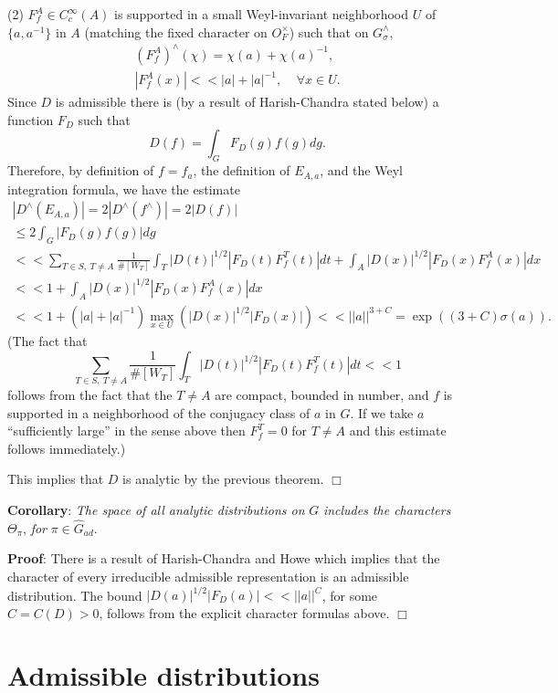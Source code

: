 \documentclass[11pt, a4paper]{article}
\begin{document}
(2) $F_f^A\in C_c^\infty (A)$ is supported in a small Weyl-invariant neighborhood $U$ of $\{a,a^{-1}\}$ in $%
A$ (matching the fixed character on $O_F^{\times }$) such that on $G_\sigma ^{\wedge }$,
\[
\begin{array}{c}
(F_f^A)^{\wedge }(\chi )=\chi (a)+\chi (a)^{-1}, \\ 
|F_f^A(x)|<<|a|+|a|^{-1},\;\;\;\;\forall x\in U.
\end{array}
\]
Since $D$ is admissible there is (by a result of Harish-Chandra stated
below) a function $F_D$ such that
\[
D(f)=\int_GF_D(g)f(g)dg.
\]
Therefore, by definition of $f=f_a$, the definition of $E_{A,a}$, and the
Weyl integration formula, we have the estimate
\[
\begin{array}{c}
|D^{\wedge }(E_{A,a})|=2|D^{\wedge }(f^{\wedge })|=2|D(f)| \\ 
\leq 2\int_G|F_D(g)f(g)|dg \\ 
<<\sum_{T\in S,\ T\neq A } \frac
1{\#[W_T]}\int_T|D(t)|^{1/2}|F_D(t)F_f^T(t)|dt+%
\int_A|D(x)|^{1/2}|F_D(x)F_f^A(x)|dx \\ 
<<1+\int_A|D(x)|^{1/2}|F_D(x)F_f^A(x)|dx \\ 
<<1+(|a|+|a|^{-1})\max _{x\in U}\left(|D(x)|^{1/2}|F_D(x)|\right)<<||a||^{3+C}=\exp ((3+C)\sigma (a)).
\end{array}
\]
(The fact that
\[
\sum_{ T\in S, \ T\neq A }\frac
1{\#[W_T]}\int_T|D(t)|^{1/2}|F_D(t)F_f^T(t)|dt<<1
\]
follows from the fact that the $T\neq A$ are compact, bounded in number, and 
$f$ is supported in a neighborhood of the conjugacy class of $a$ in $G$. If
we take $a$ ``sufficiently large'' in the sense above then $F_f^T=0$ for $T\neq A$ and this estimate
follows immediately.)

This implies that $D$ is analytic by the previous theorem. $\Box $

{\bf Corollary}: {\em The space of all analytic distributions on }$G$ {\em %
includes the characters }$\Theta _\pi $, {\em for }$\pi \in \hat G_{ad}$.

{\bf Proof}: There is a result of Harish-Chandra and Howe which implies that
the character of every irreducible admissible representation is an
admissible distribution. The bound $|D(a)|^{1/2}|F_D(a)|<<||a||^C$, for some 
$C=C(D)>0$, follows from the explicit character formulas above. $\Box $

\section{Admissible distributions}
\end{document}

